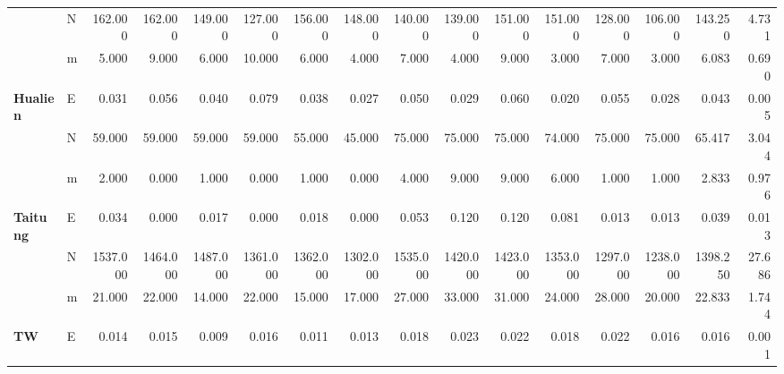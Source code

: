 \documentclass[
]{article}
\begin{document}
\begin{table}[H]
\begin{tabular}{>{}l|l|r|r|r|r|r|r|r|r|r|r|r|r|r|r}
\cline{1-16}
 & N & 162.000 & 162.000 & 149.000 & 127.000 & 156.000 & 148.000 & 140.000 & 139.000 & 151.000 & 151.000 & 128.000 & 106.000 & 143.250 & 4.731\\
\cline{2-16}
 & m & 5.000 & 9.000 & 6.000 & 10.000 & 6.000 & 4.000 & 7.000 & 4.000 & 9.000 & 3.000 & 7.000 & 3.000 & 6.083 & 0.690\\
\cline{2-16}
\multirow[t]{-3}{*}{\raggedright\arraybackslash \textbf{Hualien}} & E & 0.031 & 0.056 & 0.040 & 0.079 & 0.038 & 0.027 & 0.050 & 0.029 & 0.060 & 0.020 & 0.055 & 0.028 & 0.043 & 0.005\\
\cline{1-16}
 & N & 59.000 & 59.000 & 59.000 & 59.000 & 55.000 & 45.000 & 75.000 & 75.000 & 75.000 & 74.000 & 75.000 & 75.000 & 65.417 & 3.044\\
\cline{2-16}
 & m & 2.000 & 0.000 & 1.000 & 0.000 & 1.000 & 0.000 & 4.000 & 9.000 & 9.000 & 6.000 & 1.000 & 1.000 & 2.833 & 0.976\\
\cline{2-16}
\multirow[t]{-3}{*}{\raggedright\arraybackslash \textbf{Taitung}} & E & 0.034 & 0.000 & 0.017 & 0.000 & 0.018 & 0.000 & 0.053 & 0.120 & 0.120 & 0.081 & 0.013 & 0.013 & 0.039 & 0.013\\
\cline{1-16}
 & N & 1537.000 & 1464.000 & 1487.000 & 1361.000 & 1362.000 & 1302.000 & 1535.000 & 1420.000 & 1423.000 & 1353.000 & 1297.000 & 1238.000 & 1398.250 & 27.686\\
\cline{2-16}
 & m & 21.000 & 22.000 & 14.000 & 22.000 & 15.000 & 17.000 & 27.000 & 33.000 & 31.000 & 24.000 & 28.000 & 20.000 & 22.833 & 1.744\\
\cline{2-16}
\multirow[t]{-3}{*}{\raggedright\arraybackslash \textbf{TW}} & E & 0.014 & 0.015 & 0.009 & 0.016 & 0.011 & 0.013 & 0.018 & 0.023 & 0.022 & 0.018 & 0.022 & 0.016 & 0.016 & 0.001\\
\hline
\end{tabular}
\end{table}
\end{document}
